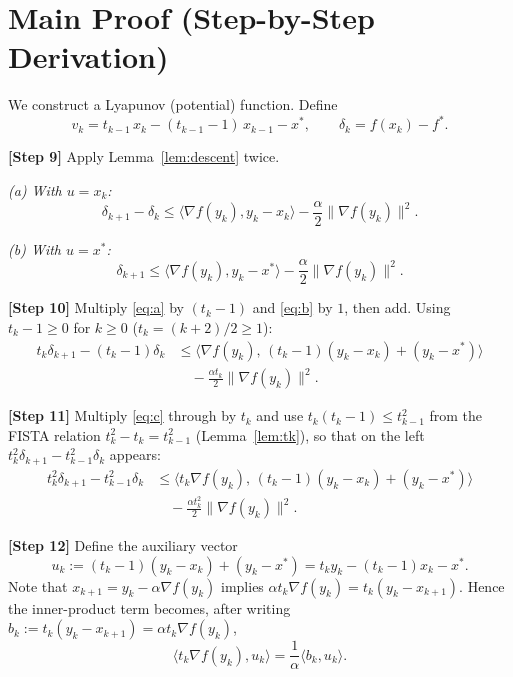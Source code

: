 \documentclass{article}
\begin{document}
\section*{Main Proof (Step-by-Step Derivation)}

We construct a Lyapunov (potential) function. Define
\begin{equation}
v_k = t_{k-1}\, x_k - (t_{k-1}-1)\, x_{k-1} - x^*, \qquad
\delta_k = f(x_k) - f^*. \label{eq:vk}
\end{equation}

\textbf{[Step 9]} Apply Lemma~\ref{lem:descent} twice.

\emph{(a) With $u = x_k$:}
\begin{equation}
\delta_{k+1} - \delta_k
\le \langle \nabla f(y_k), y_k - x_k\rangle
- \frac{\alpha}{2}\|\nabla f(y_k)\|^2. \label{eq:a}
\end{equation}

\emph{(b) With $u = x^*$:}
\begin{equation}
\delta_{k+1}
\le \langle \nabla f(y_k), y_k - x^*\rangle
- \frac{\alpha}{2}\|\nabla f(y_k)\|^2. \label{eq:b}
\end{equation}

\textbf{[Step 10]} Multiply \eqref{eq:a} by $(t_k - 1)$ and \eqref{eq:b} by $1$,
then add. Using $t_k - 1 \ge 0$ for $k \ge 0$ ($t_k = (k+2)/2 \ge 1$):
\begin{align}
t_k \delta_{k+1} - (t_k-1)\delta_k
&\le \big\langle \nabla f(y_k),\, (t_k-1)(y_k-x_k) + (y_k - x^*)\big\rangle
\nonumber\\
&\quad - \frac{\alpha t_k}{2}\|\nabla f(y_k)\|^2. \label{eq:c}
\end{align}

\textbf{[Step 11]} Multiply \eqref{eq:c} through by $t_k$ and use
$t_k(t_k - 1) \le t_{k-1}^2$ from the FISTA relation
$t_k^2 - t_k = t_{k-1}^2$ (Lemma~\ref{lem:tk}), so that on the left
$t_k^2 \delta_{k+1} - t_{k-1}^2 \delta_k$ appears:
\begin{align}
t_k^2 \delta_{k+1} - t_{k-1}^2 \delta_k
&\le \big\langle t_k \nabla f(y_k),\, (t_k-1)(y_k-x_k) + (y_k - x^*)\big\rangle
\nonumber\\
&\quad - \frac{\alpha t_k^2}{2}\|\nabla f(y_k)\|^2. \label{eq:d}
\end{align}

\textbf{[Step 12]} Define the auxiliary vector
\[
u_k := (t_k-1)(y_k - x_k) + (y_k - x^*) = t_k y_k - (t_k-1)x_k - x^*.
\]
Note that $x_{k+1} = y_k - \alpha\nabla f(y_k)$ implies
$\alpha t_k \nabla f(y_k) = t_k(y_k - x_{k+1})$. Hence the inner-product term
becomes, after writing $b_k := t_k(y_k - x_{k+1}) = \alpha t_k \nabla f(y_k)$,
\[
\langle t_k \nabla f(y_k), u_k\rangle
= \frac{1}{\alpha}\langle b_k, u_k\rangle.
\]
\end{document}
